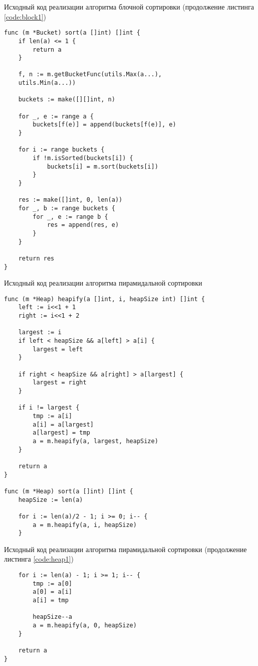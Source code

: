 \newpage

\begin{code}
\caption{Исходный код реализации алгоритма блочной сортировки (продолжение листинга \ref{code:block1})}
\label{code:block2}
\begin{verbatim}
func (m *Bucket) sort(a []int) []int {
	if len(a) <= 1 {
		return a
	}

	f, n := m.getBucketFunc(utils.Max(a...), 
	utils.Min(a...))

	buckets := make([][]int, n)

	for _, e := range a {
		buckets[f(e)] = append(buckets[f(e)], e)
	}

	for i := range buckets {
		if !m.isSorted(buckets[i]) {
			buckets[i] = m.sort(buckets[i])
		}
	}

	res := make([]int, 0, len(a))
	for _, b := range buckets {
		for _, e := range b {
			res = append(res, e)
		}
	}

	return res
}
\end{verbatim}
\end{code}

\newpage

\begin{code}
\caption{Исходный код реализации алгоритма пирамидальной сортировки}
\label{code:heap1}
\begin{verbatim}
func (m *Heap) heapify(a []int, i, heapSize int) []int {
	left := i<<1 + 1
	right := i<<1 + 2

	largest := i
	if left < heapSize && a[left] > a[i] {
		largest = left
	}

	if right < heapSize && a[right] > a[largest] {
		largest = right
	}

	if i != largest {
		tmp := a[i]
		a[i] = a[largest]
		a[largest] = tmp
		a = m.heapify(a, largest, heapSize)
	}

	return a
}

func (m *Heap) sort(a []int) []int {
	heapSize := len(a)

	for i := len(a)/2 - 1; i >= 0; i-- {
		a = m.heapify(a, i, heapSize)
	}
\end{verbatim}
\end{code}

\newpage

\begin{code}
\caption{Исходный код реализации алгоритма пирамидальной сортировки (продолжение листинга \ref{code:heap1})}
\label{code:heap2}
\begin{verbatim}
    for i := len(a) - 1; i >= 1; i-- {
		tmp := a[0]
		a[0] = a[i]
		a[i] = tmp

		heapSize--a
		a = m.heapify(a, 0, heapSize)
	}

	return a
}
\end{verbatim}
\end{code}

